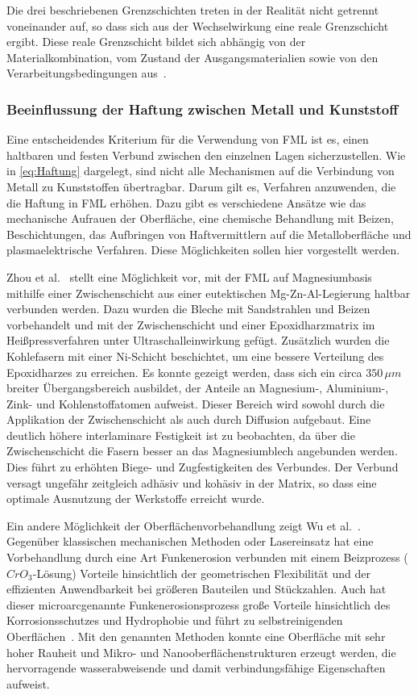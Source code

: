 Die drei beschriebenen Grenzschichten treten in der Realität nicht getrennt voneinander auf, so dass sich aus der Wechselwirkung eine reale Grenzschicht ergibt.
Diese reale Grenzschicht bildet sich abhängig von der Materialkombination, vom Zustand der Ausgangsmaterialien sowie von den Verarbeitungsbedingungen aus~\cite{Flock2012}.

\subsubsection{Beeinflussung der Haftung zwischen Metall und Kunststoff}\label{subsubsec:beeinflussung}

Eine entscheidendes Kriterium für die Verwendung von FML ist es, einen haltbaren und festen Verbund zwischen den einzelnen Lagen sicherzustellen.
Wie in \autoref{eq:Haftung} dargelegt, sind nicht alle Mechanismen auf die Verbindung von Metall zu Kunststoffen übertragbar.
Darum gilt es, Verfahren anzuwenden, die die Haftung in FML erhöhen.
Dazu gibt es verschiedene Ansätze wie das mechanische Aufrauen der Oberfläche, eine chemische Behandlung mit Beizen, Beschichtungen, das Aufbringen von Haftvermittlern auf die Metalloberfläche und plasmaelektrische Verfahren.
Diese Möglichkeiten sollen hier vorgestellt werden.

Zhou et al.~\cite{Zhou2021} stellt eine Möglichkeit vor, mit der FML auf Magnesiumbasis mithilfe einer Zwischenschicht aus einer eutektischen Mg-Zn-Al-Legierung haltbar verbunden werden.
Dazu wurden die Bleche mit Sandstrahlen und Beizen vorbehandelt und mit der Zwischenschicht und einer Epoxidharzmatrix im Heißpressverfahren unter Ultraschalleinwirkung gefügt.
Zusätzlich wurden die Kohlefasern mit einer Ni-Schicht beschichtet, um eine bessere Verteilung des Epoxidharzes zu erreichen.
Es konnte gezeigt werden, dass sich ein circa $350 \, \mu m$ breiter Übergangsbereich ausbildet, der Anteile an Magnesium-, Aluminium-, Zink- und Kohlenstoffatomen aufweist.
Dieser Bereich wird sowohl durch die Applikation der Zwischenschicht als auch durch Diffusion aufgebaut.
Eine deutlich höhere interlaminare Festigkeit ist zu beobachten, da über die Zwischenschicht die Fasern besser an das Magnesiumblech angebunden werden.
Dies führt zu erhöhten Biege- und Zugfestigkeiten des Verbundes.
Der Verbund versagt ungefähr zeitgleich adhäsiv und kohäsiv in der Matrix, so dass eine optimale Ausnutzung der Werkstoffe erreicht wurde.

Ein andere Möglichkeit der Oberflächenvorbehandlung zeigt Wu et al.~\cite{Wu2016}.
Gegenüber klassischen mechanischen Methoden oder Lasereinsatz hat eine Vorbehandlung durch eine Art Funkenerosion verbunden mit einem Beizprozess ($CrO_3$-Lösung) Vorteile hinsichtlich der geometrischen Flexibilität und der effizienten Anwendbarkeit bei größeren Bauteilen und Stückzahlen.
Auch hat dieser \glqq microarc\grqq genannte Funkenerosionsprozess große Vorteile hinsichtlich des Korrosionsschutzes und Hydrophobie und führt zu selbstreinigenden Oberflächen~\cite{Lu2015}.
Mit den genannten Methoden konnte eine Oberfläche mit sehr hoher Rauheit und Mikro- und Nanooberflächenstrukturen erzeugt werden, die hervorragende wasserabweisende und damit verbindungsfähige Eigenschaften aufweist.

